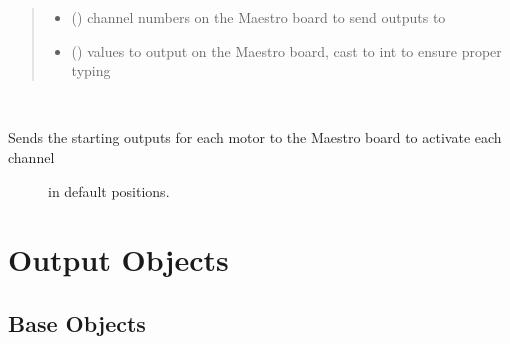 \documentclass[letterpaper,10pt,english]{sphinxmanual}
\begin{document}
\begin{fulllineitems}
\begin{fulllineitems}
\begin{quote}
\begin{description}
\begin{itemize}
\item {} 
\sphinxAtStartPar
{} (\sphinxstyleliteralemphasis{\sphinxupquote{{[}}}\sphinxstyleliteralemphasis{\sphinxupquote{{]}}}) \textendash{} channel numbers on the Maestro board to send outputs to

\item {} 
\sphinxAtStartPar
{} (\sphinxstyleliteralemphasis{\sphinxupquote{{[}}}\sphinxstyleliteralemphasis{\sphinxupquote{{]}}}) \textendash{} values to output on the Maestro board, cast to int to ensure proper
typing

\end{itemize}

\end{description}\end{quote}

\end{fulllineitems}


\begin{fulllineitems}
\label{\detokenize{movementmap:MovementMap.MovementMap.start_outputs}}~\begin{description}
\item[{Sends the starting outputs for each motor to the Maestro board to activate each channel}] \leavevmode
\sphinxAtStartPar
in default positions.

\end{description}

\end{fulllineitems}


\end{fulllineitems}



\chapter{Output Objects}
\label{\detokenize{output:output-objects}}\label{\detokenize{output::doc}}

\section{Base Objects}
\label{\detokenize{base:base-objects}}\label{\detokenize{base::doc}}
\end{document}

